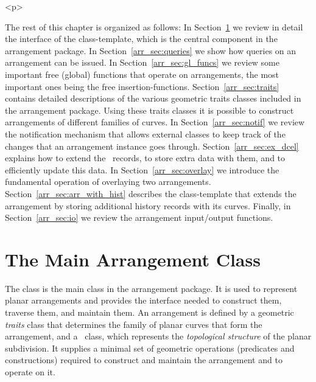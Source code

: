 \begin{ccHtmlOnly}<p>\end{ccHtmlOnly}
The rest of this chapter is organized as follows: In
Section~\ref{arr_sec:arr_class} we review in detail the interface
of the  class-template, which is the central
component in the arrangement package. In
Section~\ref{arr_sec:queries} we show how queries on an arrangement
can be issued. In Section~\ref{arr_sec:gl_funcs} we
review some important free (global) functions that operate on
arrangements, the most important ones being the free 
insertion-functions. Section~\ref{arr_sec:traits} contains detailed
descriptions of the various geometric traits classes included in
the arrangement package. Using these traits classes it is possible
to construct arrangements of different families of curves. In
Section~\ref{arr_sec:notif} we review the notification mechanism
that allows external classes to keep track of the changes that an
arrangement instance goes through. Section~\ref{arr_sec:ex_dcel}
explains how to extend the \dcel\ records, to store extra data
with them, and to efficiently update this data.
In Section~\ref{arr_sec:overlay} we introduce the fundamental
operation of overlaying two arrangements.
Section~\ref{arr_sec:arr_with_hist} describes the
 class-template that extends the
arrangement by storing additional history records with its curves.
Finally, in Section~\ref{arr_sec:io} we review the arrangement
input/output functions.

\section{The Main Arrangement Class}
\label{arr_sec:arr_class}
%
The class  is the main class in
the arrangement package. It is used to represent planar
arrangements and provides the interface needed to construct them,
traverse them, and maintain them. An arrangement is defined by
a geometric {\em traits} class that determines the family of planar
curves that form the arrangement, and a \dcel\ class, which
represents the {\em topological structure} of the planar subdivision.
It supplies a minimal set of geometric operations (predicates and
constructions) required to construct and maintain the arrangement
and to operate on it.

